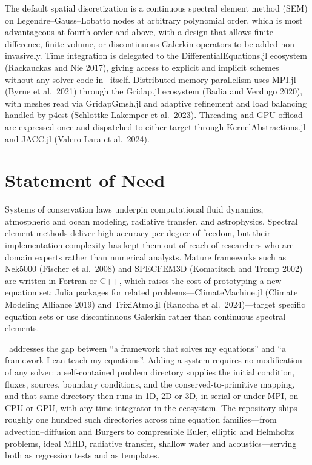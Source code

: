 \documentclass[10pt,onecolumn]{article}
\begin{document}
The default spatial discretization is a continuous spectral element method (SEM)
on Legendre--Gauss--Lobatto nodes at arbitrary polynomial order, which is most
advantageous at fourth order and above, with a design that allows finite
difference, finite volume, or discontinuous Galerkin operators to be added
non-invasively. Time integration is delegated to the DifferentialEquations.jl
ecosystem (Rackauckas and Nie 2017), giving access to explicit and implicit
schemes without any solver code in \je~itself. Distributed-memory parallelism
uses MPI.jl (Byrne et al.\ 2021) through the Gridap.jl ecosystem (Badia and
Verdugo 2020), with meshes read via GridapGmsh.jl and adaptive refinement and
load balancing handled by p4est (Schlottke-Lakemper et al.\ 2023). Threading and
GPU offload are expressed once and dispatched to either target through
KernelAbstractions.jl and JACC.jl (Valero-Lara et al.\ 2024).

\section{Statement of Need}\label{statement-of-need}

Systems of conservation laws underpin computational fluid dynamics, atmospheric
and ocean modeling, radiative transfer, and astrophysics. Spectral element
methods deliver high accuracy per degree of freedom, but their implementation
complexity has kept them out of reach of researchers who are domain experts
rather than numerical analysts. Mature frameworks such as Nek5000 (Fischer et
al.\ 2008) and SPECFEM3D (Komatitsch and Tromp 2002) are written in Fortran or
C++, which raises the cost of prototyping a new equation set; Julia packages for
related problems---ClimateMachine.jl (Climate Modeling Alliance 2019) and
TrixiAtmo.jl (Ranocha et al.\ 2024)---target specific equation sets or use
discontinuous Galerkin rather than continuous spectral elements.

\je~addresses the gap between ``a framework that solves my equations'' and ``a
framework I can teach my equations''. Adding a system requires no modification of
any solver: a self-contained problem directory supplies the initial condition,
fluxes, sources, boundary conditions, and the conserved-to-primitive mapping, and
that same directory then runs in 1D, 2D or 3D, in serial or under MPI, on CPU or
GPU, with any time integrator in the ecosystem. The repository ships roughly one hundred such directories across nine
equation families---from advection--diffusion and Burgers to compressible Euler,
elliptic and Helmholtz problems, ideal MHD, radiative transfer, shallow water
and acoustics---serving both as regression tests and as templates.
\end{document}
